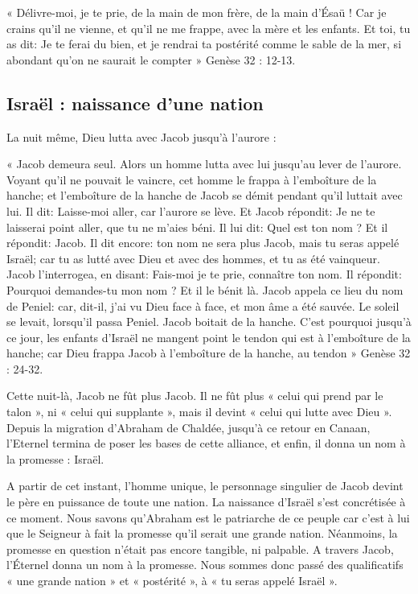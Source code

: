 « Délivre-moi, je te prie, de la main de mon frère, de la main d'Ésaü ! Car je crains qu'il ne vienne, et qu'il ne me frappe, avec la mère et les enfants. Et toi, tu as dit: Je te ferai du bien, et je rendrai ta postérité comme le sable de la mer, si abondant qu'on ne saurait le compter » Genèse 32 : 12-13.

\subsection*{Israël : naissance d'une nation}

La nuit même, Dieu lutta avec Jacob jusqu'à l'aurore :

« Jacob demeura seul. Alors un homme lutta avec lui jusqu'au lever de l'aurore. Voyant qu'il ne pouvait le vaincre, cet homme le frappa à l'emboîture de la hanche; et l'emboîture de la hanche de Jacob se démit pendant qu'il luttait avec lui. Il dit: Laisse-moi aller, car l'aurore se lève. Et Jacob répondit: Je ne te laisserai point aller, que tu ne m'aies béni. Il lui dit: Quel est ton nom ? Et il répondit: Jacob. Il dit encore: ton nom ne sera plus Jacob, mais tu seras appelé Israël; car tu as lutté avec Dieu et avec des hommes, et tu as été vainqueur. Jacob l'interrogea, en disant: Fais-moi je te prie, connaître ton nom. Il répondit: Pourquoi demandes-tu mon nom ? Et il le bénit là. Jacob appela ce lieu du nom de Peniel: car, dit-il, j'ai vu Dieu face à face, et mon âme a été sauvée. Le soleil se levait, lorsqu'il passa Peniel. Jacob boitait de la hanche. C'est pourquoi jusqu'à ce jour, les enfants d'Israël ne mangent point le tendon qui est à l'emboîture de la hanche; car Dieu frappa Jacob à l'emboîture de la hanche, au tendon » Genèse 32 : 24-32.

Cette nuit-là, Jacob ne fût plus Jacob. Il ne fût plus « celui qui prend par le talon », ni « celui qui supplante », mais il devint « celui qui lutte avec Dieu ». Depuis la migration d'Abraham de Chaldée, jusqu'à ce retour en Canaan, l'Eternel termina de poser les bases de cette alliance, et enfin, il donna un nom à la promesse : Israël.

A partir de cet instant, l'homme unique, le personnage singulier de Jacob devint le père en puissance de toute une nation. La naissance d'Israël s'est concrétisée à ce moment. Nous savons qu'Abraham est le patriarche de ce peuple car c'est à lui que le Seigneur à fait la promesse qu'il serait une grande nation. Néanmoins, la promesse en question n'était pas encore tangible, ni palpable. A travers Jacob, l’Éternel donna un nom à la promesse. Nous sommes donc passé des qualificatifs « une grande nation » et « postérité », à « tu seras appelé Israël ».

